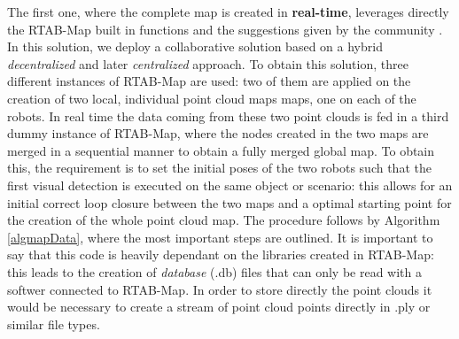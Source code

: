 The first one, where the complete map is created in \textbf{real-time}, leverages directly the RTAB-Map built in functions and the suggestions given by the community \cite{rtabmapforum}. In this solution, we deploy a collaborative solution based on a hybrid \textit{decentralized} and later \textit{centralized} approach. To obtain this solution, three different instances of RTAB-Map are used: two of them are applied on the creation of two local, individual point cloud maps maps, one on each of the robots. In real time the data coming from these two point clouds is fed in a third dummy instance of RTAB-Map, where the nodes created in the two maps are merged in a sequential manner to obtain a fully merged global map. To obtain this, the requirement is to set the initial poses of the two robots such that the first visual detection is executed on the same object or scenario: this allows for an initial correct loop closure between the two maps and a optimal starting point for the creation of the whole point cloud map. The procedure follows by Algorithm \ref{algmapData}, where the most important steps are outlined. It is important to say that this code is heavily dependant on the libraries created in RTAB-Map: this leads to the creation of \textit{database} (.db) files that can only be read with a softwer connected to RTAB-Map. In order to store directly the point clouds it would be necessary to create a stream of point cloud points directly in .ply or similar file types.

